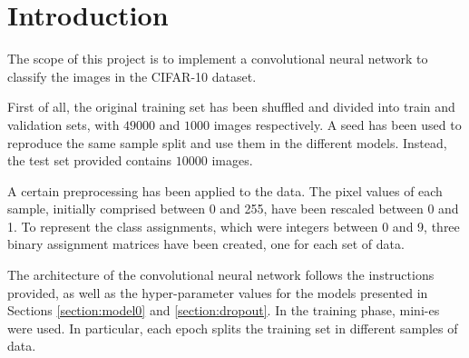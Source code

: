 \documentclass[a4paper,12pt]{article} %
\begin{document}
	

	\thispagestyle{empty}  
	\vspace{0.4cm}

	
	\section{Introduction}
	The scope of this project is to implement a convolutional neural network to 
	classify the images in the CIFAR-10 dataset.
	
	First of all, the original training set has been shuffled and divided into 
	train and validation sets, with $49000$ and $1000$ images respectively. A 
	seed has been used to reproduce the same sample split and use them in the 
	different models. Instead, the test set provided contains $10000$ images.
	
	A certain preprocessing has been applied to the data. The pixel values of 
	each sample, initially comprised between 0 and 255, have been rescaled 
	between 0 and 1. To represent the class assignments, which were integers 
	between 0 and 9, three binary assignment matrices have been created, one 
	for each set of data. 
	
	The architecture of the convolutional neural network follows the 
	instructions provided, as well as the hyper-parameter values for the models 
	presented in Sections \ref{section:model0} and \ref{section:dropout}.
	In the training phase, mini-es were used. In particular, each 
	epoch splits the training set in different samples of data.
	
\end{document}
